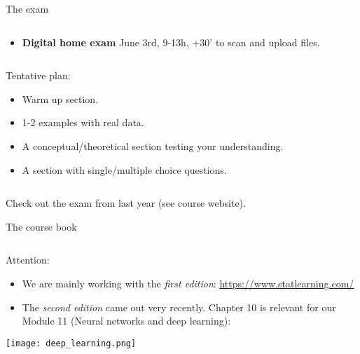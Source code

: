 \documentclass[10pt,ignorenonframetext,]{beamer}
\providecommand{\tightlist}{%
  \setlength{\itemsep}{0pt}\setlength{\parskip}{0pt}}
\begin{document}
\begin{frame}{The exam}
\protect\hypertarget{the-exam}{}

\(~\)

\begin{itemize}
\tightlist
\item
  \textbf{Digital home exam} June 3rd, 9-13h, +30' to scan and upload
  files.
\end{itemize}

\(~\)

Tentative plan:

\begin{itemize}
\tightlist
\item
  Warm up section.
\item
  1-2 examples with real data.
\item
  A conceptual/theoretical section testing your understanding.
\item
  A section with single/multiple choice questions.
\end{itemize}

\(~\)

Check out the exam from last year (see course website).

\end{frame}

\begin{frame}{The course book}
\protect\hypertarget{the-course-book}{}

\(~\)

Attention:

\begin{itemize}
\item
  We are mainly working with the \emph{first edition}:
  \url{https://www.statlearning.com/}
\item
  The \emph{second edition} came out very recently. Chapter 10 is
  relevant for our Module 11 (Neural networks and deep learning):
\end{itemize}

\centering

\texttt{[image: deep\_learning.png]}

\end{frame}
\end{document}
